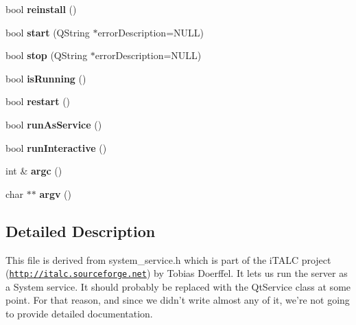 \begin{DoxyCompactItemize}
\item 
\hypertarget{class_system_service_a77088380f6648923d61bd463a6e47e71}{bool {\bfseries reinstall} ()}\label{class_system_service_a77088380f6648923d61bd463a6e47e71}

\item 
\hypertarget{class_system_service_acf9289ae7719eeb0973500b6ccef9a4d}{bool {\bfseries start} (Q\-String $\ast$error\-Description=N\-U\-L\-L)}\label{class_system_service_acf9289ae7719eeb0973500b6ccef9a4d}

\item 
\hypertarget{class_system_service_a8bc07f9639b9e494f396c77f17fee7a2}{bool {\bfseries stop} (Q\-String $\ast$error\-Description=N\-U\-L\-L)}\label{class_system_service_a8bc07f9639b9e494f396c77f17fee7a2}

\item 
\hypertarget{class_system_service_ab824ba0600a5402eaa87e83921b9342b}{bool {\bfseries is\-Running} ()}\label{class_system_service_ab824ba0600a5402eaa87e83921b9342b}

\item 
\hypertarget{class_system_service_a5e038df3aa1fb6126c7c7e953ff018e4}{bool {\bfseries restart} ()}\label{class_system_service_a5e038df3aa1fb6126c7c7e953ff018e4}

\item 
\hypertarget{class_system_service_ad2dd4ffca97814be7077922b14ac6737}{bool {\bfseries run\-As\-Service} ()}\label{class_system_service_ad2dd4ffca97814be7077922b14ac6737}

\item 
\hypertarget{class_system_service_aca576c90c82b50eb97106e97b58bb7fa}{bool {\bfseries run\-Interactive} ()}\label{class_system_service_aca576c90c82b50eb97106e97b58bb7fa}

\item 
\hypertarget{class_system_service_a9bd10b10928c484e96f5f06830f4c59a}{int \& {\bfseries argc} ()}\label{class_system_service_a9bd10b10928c484e96f5f06830f4c59a}

\item 
\hypertarget{class_system_service_a0954ce8d857694cc75746232370e74a3}{char $\ast$$\ast$ {\bfseries argv} ()}\label{class_system_service_a0954ce8d857694cc75746232370e74a3}

\end{DoxyCompactItemize}


\subsection{Detailed Description}
This file is derived from system\-\_\-service.\-h which is part of the i\-T\-A\-L\-C project (\href{http://italc.sourceforge.net}{\tt http\-://italc.\-sourceforge.\-net}) by Tobias Doerffel. It lets us run the server as a System service. It should probably be replaced with the Qt\-Service class at some point. For that reason, and since we didn't write almost any of it, we're not going to provide detailed documentation. 

